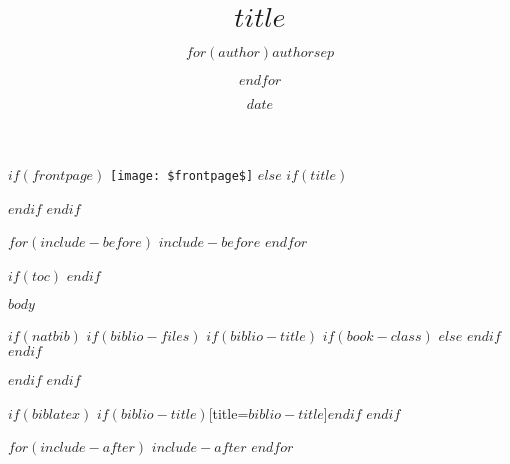 \documentclass[$if(classoption)$$classoption$,$endif$$if(fontsize)$$fontsize$,$endif$$if(lang)$$lang$,$endif$]{$documentclass$}
\title{$title$}
\author{$for(author)$$author$$sep$ \and $endfor$}
\date{$date$}
\makeatletter
\def\maxwidth{\ifdim\Gin@nat@width>\linewidth\linewidth
    \else\Gin@nat@width\fi}
\let\Oldincludegraphics\includegraphics
\renewcommand{\includegraphics}[1]{\Oldincludegraphics[width=\maxwidth]{#1}}
\makeatother
\begin{document}
    $if(frontpage)$
        \thispagestyle{empty}
        \texttt{[image: \$frontpage\$]}
    $else$
        $if(title)$
            \maketitle
            \thispagestyle{empty}
            \pagebreak
        $endif$
    $endif$
        

    $for(include-before)$
        $include-before$
    $endfor$

    
    $if(toc)$
    {
        \hypersetup{linkcolor=violet}
        \setcounter{tocdepth}{$toc-depth$}
        \tableofcontents
        \newpage
    }
    $endif$


    $body$
    

    $if(natbib)$
        $if(biblio-files)$
            $if(biblio-title)$
                $if(book-class)$
                    \renewcommand\bibname{$biblio-title$}
                $else$
                    \renewcommand\refname{$biblio-title$}
                $endif$
            $endif$
            
        $endif$
    $endif$
    
    $if(biblatex)$
        \printbibliography$if(biblio-title)$[title=$biblio-title$]$endif$
    $endif$

    
    $for(include-after)$
        $include-after$
    $endfor$
    
\end{document}
